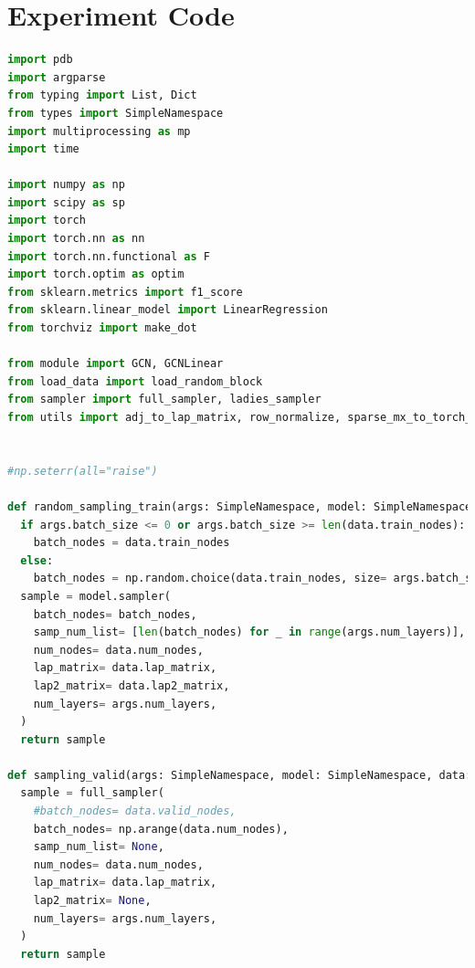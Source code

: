 \newpage
\appendix
\chapter{Experiment Code}
\begin{lstlisting}[language=Python, caption= Training code, label=ls:train_code]
import pdb
import argparse
from typing import List, Dict
from types import SimpleNamespace
import multiprocessing as mp
import time

import numpy as np
import scipy as sp
import torch
import torch.nn as nn
import torch.nn.functional as F
import torch.optim as optim
from sklearn.metrics import f1_score
from sklearn.linear_model import LinearRegression
from torchviz import make_dot

from module import GCN, GCNLinear
from load_data import load_random_block
from sampler import full_sampler, ladies_sampler
from utils import adj_to_lap_matrix, row_normalize, sparse_mx_to_torch_sparse_tensor, sparse_fill


#np.seterr(all="raise")

def random_sampling_train(args: SimpleNamespace, model: SimpleNamespace, data: SimpleNamespace) -> SimpleNamespace:
  if args.batch_size <= 0 or args.batch_size >= len(data.train_nodes):
    batch_nodes = data.train_nodes
  else:
    batch_nodes = np.random.choice(data.train_nodes, size= args.batch_size, replace= True)
  sample = model.sampler(
    batch_nodes= batch_nodes,
    samp_num_list= [len(batch_nodes) for _ in range(args.num_layers)],
    num_nodes= data.num_nodes,
    lap_matrix= data.lap_matrix,
    lap2_matrix= data.lap2_matrix,
    num_layers= args.num_layers,
  )
  return sample

def sampling_valid(args: SimpleNamespace, model: SimpleNamespace, data: SimpleNamespace) -> SimpleNamespace:
  sample = full_sampler(
    #batch_nodes= data.valid_nodes,
    batch_nodes= np.arange(data.num_nodes),
    samp_num_list= None,
    num_nodes= data.num_nodes,
    lap_matrix= data.lap_matrix,
    lap2_matrix= None,
    num_layers= args.num_layers,
  )
  return sample




\end{lstlisting}
